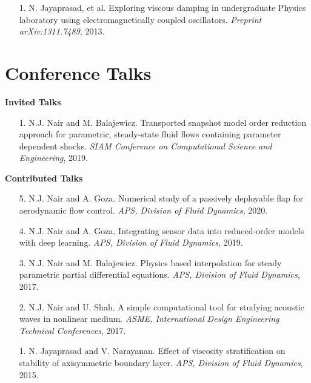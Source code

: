 \documentclass[margin]{res}
\begin{document}
\begin{resume}
\begin{itemize}
  \item[1.] N. Jayaprasad, et al. Exploring viscous damping in undergraduate Physics laboratory using electromagnetically coupled oscillators. \textit{Preprint arXiv:1311.7489}, 2013.
 \end{itemize}
 
\section{\large Conference Talks}

\textbf{Invited Talks}

\begin{itemize} 
 \item[1.] N.J. Nair and M. Balajewicz. Transported snapshot model order reduction approach for parametric, steady-state fluid flows containing parameter dependent shocks. \textit{SIAM Conference on Computational Science and Engineering}, 2019.
\end{itemize}

\textbf{Contributed Talks} 
\begin{itemize}
	
 \item[5.] N.J. Nair and A. Goza. Numerical study of a passively deployable flap for aerodynamic flow control. \textit{APS, Division of Fluid Dynamics}, 2020.
 
 \item[4.] N.J. Nair and A. Goza. Integrating sensor data into reduced-order models with deep learning. \textit{APS, Division of Fluid Dynamics}, 2019.

 \item[3.] N.J. Nair and M. Balajewicz. Physics based interpolation for steady parametric partial differential equations. \textit{APS, Division of Fluid Dynamics}, 2017.
 
 \item[2.] N.J. Nair and U. Shah. A simple computational tool for studying acoustic waves in nonlinear medium. \textit{ASME, International Design Engineering Technical Conferences}, 2017.
 
 \item[1.] N. Jayaprasad and V. Narayanan. Effect of viscosity stratification on stability of axisymmetric boundary layer. \textit{APS, Division of Fluid Dynamics}, 2015.
  
\end{itemize}
		 

\end{resume}
\end{document}
